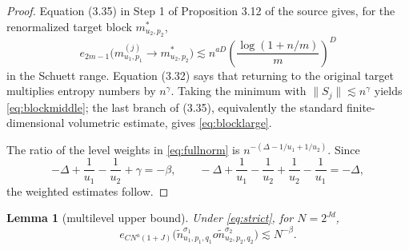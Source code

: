 \documentclass[11pt]{article}
\newtheorem{lemma}[theorem]{Lemma}
\begin{document}
\begin{proof}
Equation (3.35) in Step 1 of Proposition 3.12 of the source gives, for the
renormalized target block $m^*_{u_2,p_2}$,
\[
 e_{2m-1}\big(m^{(j)}_{u_1,p_1}\to m^*_{u_2,p_2}\big)
 \lesssim n^{aD}
 \left(\frac{\log(1+n/m)}m\right)^D
\]
in the Schuett range.  Equation (3.32) says that returning to the original
target multiplies entropy numbers by $n^\gamma$.  Taking the minimum with
$\|S_j\|\lesssim n^\gamma$ yields \eqref{eq:blockmiddle}; the last branch of
(3.35), equivalently the standard finite-dimensional volumetric estimate,
gives \eqref{eq:blocklarge}.

The ratio of the level weights in \eqref{eq:fullnorm} is
$n^{-(\Delta-1/u_1+1/u_2)}$.  Since
\[
 -\Delta+\frac1{u_1}-\frac1{u_2}+\gamma=-\beta,
 \qquad
 -\Delta+\frac1{u_1}-\frac1{u_2}
 +\frac1{u_2}-\frac1{u_1}=-\Delta,
\]
the weighted estimates follow.
\end{proof}

\begin{lemma}[multilevel upper bound]\label{lem:globalupper}
Under \eqref{eq:strict}, for $N=2^{Jd}$,
\begin{equation}\label{eq:dyadicupper}
 e_{C N^a(1+J)}
 \big(\widetilde n^{\sigma_1}_{u_1,p_1,q_1}	o
      \widetilde n^{\sigma_2}_{u_2,p_2,q_2}\big)
 \lesssim N^{-\beta}.
\end{equation}
\end{lemma}
\end{document}
